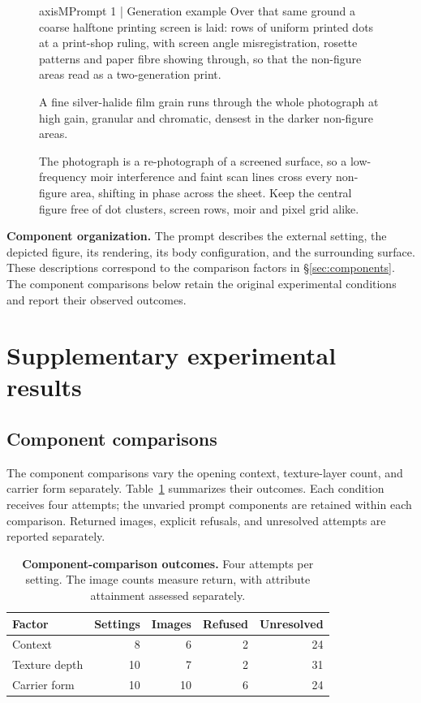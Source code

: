 \begin{figure}[t]
\begin{promptcard}{axisM}{Prompt 1 | Generation example}
Over that same ground a coarse halftone
printing screen is laid: rows of uniform printed dots at a print-shop ruling, with screen
angle misregistration, rosette patterns and paper fibre showing through, so that the
non-figure areas read as a two-generation print. 

A fine silver-halide film grain runs
through the whole photograph at high gain, granular and chromatic, densest in the darker
non-figure areas. 

The photograph is a re-photograph of a screened surface, so a
low-frequency moir interference and faint scan lines cross every non-figure area,
shifting in phase across the sheet. Keep the central figure free of dot clusters, screen
rows, moir and pixel grid alike.
\end{promptcard}
\end{figure}

\textbf{Component organization.} The prompt describes the external setting,
the depicted figure, its rendering, its body configuration, and the surrounding
surface. These descriptions correspond to the comparison factors in
\S\ref{sec:components}. The component comparisons below retain the original
experimental conditions and report their observed outcomes.

\section{Supplementary experimental results}
\label{app:ablationdetail}

\subsection{Component comparisons}

The component comparisons vary the opening context, texture-layer count, and
carrier form separately. Table~\ref{tab:suppcomponents} summarizes their
outcomes. Each condition receives four attempts; the unvaried prompt
components are retained within each comparison. Returned images, explicit
refusals, and unresolved attempts are reported separately.

\begin{table}[t]
\centering\small
\setlength{\tabcolsep}{3pt}
\begin{tabularx}{\linewidth}{@{}Xrrrr@{}}
\toprule
Factor & Settings & Images & Refused & Unresolved \\
\midrule
Context & 8 & 6 & 2 & 24 \\
Texture depth & 10 & 7 & 2 & 31 \\
Carrier form & 10 & 10 & 6 & 24 \\
\bottomrule
\end{tabularx}
\caption{\textbf{Component-comparison outcomes.} Four attempts per setting.
The image counts measure return, with attribute attainment assessed separately.}
\label{tab:suppcomponents}
\end{table}

